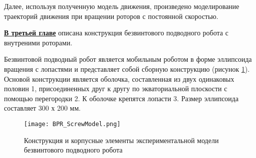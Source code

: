 %

Далее, используя полученную модель движения, произведено моделирование траекторий движения при вращении роторов с постоянной скоростью.





\underline{\textbf{В третьей главе}} описана конструкция безвинтового подводного робота с внутреними роторами. 

Безвинтовой подводный робот является мобильным роботом в форме эллипсоида вращения с лопастями и представляет собой сборную конструкцию (рисунок \ref{constr_BPR}). Основой конструкции является оболочка, составленная из двух одинаковых половин 1, присоединенных друг к другу по экваториальной плоскости с помощью перегородки 2. К оболочке крепятся лопасти 3. Размер эллипсоида составляет 300 х 200 мм. 

\begin{figure}[h]
	\centering
	\texttt{[image: BPR\_ScrewModel.png]}%
	\caption{Конструкция и корпусные элементы экспериментальной модели безвинтового подводного робота}
	\label{constr_BPR}
\end{figure}


